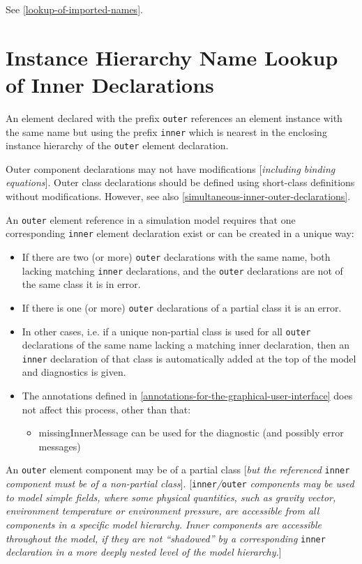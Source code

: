 See \autoref{lookup-of-imported-names}.

\section{Instance Hierarchy Name Lookup of Inner Declarations}

An element declared with the prefix \lstinline!outer! references an element instance
with the same name but using the prefix \lstinline!inner! which is nearest in the
enclosing instance hierarchy of the \lstinline!outer! element declaration.

Outer component declarations may not have modifications {[}\emph{including binding equations}{]}.
Outer class declarations should be defined using short-class
definitions without modifications. However, see also \autoref{simultaneous-inner-outer-declarations}.

An \lstinline!outer! element reference in a simulation model requires that one
corresponding \lstinline!inner! element declaration exist or can be created in a
unique way:
\begin{itemize}
\item
  If there are two (or more) \lstinline!outer! declarations with the same name, both
  lacking matching \lstinline!inner! declarations, and the \lstinline!outer! declarations are
  not of the same class it is in error.
\item
  If there is one (or more) \lstinline!outer! declarations of a partial class it is
  an error.
\item
  In other cases, i.e. if a unique non-partial class is used for all
  \lstinline!outer! declarations of the same name lacking a matching inner
  declaration, then an \lstinline!inner! declaration of that class is automatically
  added at the top of the model and diagnostics is given.
\item
  The annotations defined in \autoref{annotations-for-the-graphical-user-interface} does not affect this process,
  other than that:

  \begin{itemize}
  \item
    missingInnerMessage can be used for the diagnostic (and possibly
    error messages)
  \end{itemize}
\end{itemize}

An \lstinline!outer! element component may be of a partial class {[}\emph{but the
referenced} \lstinline!inner! \emph{component must be of a non-partial class}{]}.
{[}\lstinline!inner!\emph{/}\lstinline!outer! \emph{components may be used to model simple
fields, where some physical quantities, such as gravity vector,
environment temperature or environment pressure, are accessible from all
components in a specific model hierarchy. Inner components are
accessible throughout the model, if they are not ``shadowed'' by a
corresponding} \lstinline!inner! \emph{declaration in a more deeply nested level of
the model hierarchy.}{]}


